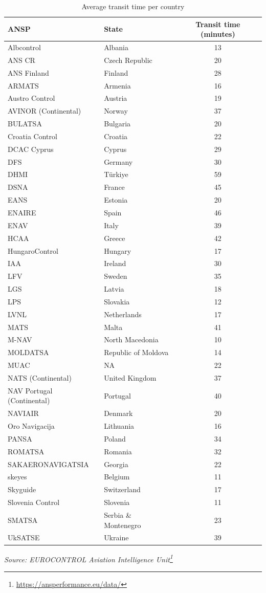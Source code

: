 \documentclass[
  11pt,
  a4paper,
]{book}
\DeclareRobustCommand{\href}[2]{#2\footnote{\url{#1}}}
\begin{document}
\hypertarget{tbl-transit-time}{}
\setlength{\LTpost}{0mm}
\begin{longtable}{llc}
\caption{\label{tbl-transit-time}Average transit time per country }\tabularnewline

\toprule
ANSP & State & Transit time (minutes) \\ 
\midrule
Albcontrol & Albania & 13 \\ 
ANS CR & Czech Republic & 20 \\ 
ANS Finland & Finland & 28 \\ 
ARMATS & Armenia & 16 \\ 
Austro Control & Austria & 19 \\ 
AVINOR (Continental) & Norway & 37 \\ 
BULATSA & Bulgaria & 20 \\ 
Croatia Control & Croatia & 22 \\ 
DCAC Cyprus & Cyprus & 29 \\ 
DFS & Germany & 30 \\ 
DHMI & Türkiye & 59 \\ 
DSNA & France & 45 \\ 
EANS & Estonia & 20 \\ 
ENAIRE & Spain & 46 \\ 
ENAV & Italy & 39 \\ 
HCAA & Greece & 42 \\ 
HungaroControl & Hungary & 17 \\ 
IAA & Ireland & 30 \\ 
LFV & Sweden & 35 \\ 
LGS & Latvia & 18 \\ 
LPS & Slovakia & 12 \\ 
LVNL & Netherlands & 17 \\ 
MATS & Malta & 41 \\ 
M-NAV & North Macedonia & 10 \\ 
MOLDATSA & Republic of Moldova & 14 \\ 
MUAC & NA & 22 \\ 
NATS (Continental) & United Kingdom & 37 \\ 
NAV Portugal (Continental) & Portugal & 40 \\ 
NAVIAIR & Denmark & 20 \\ 
Oro Navigacija & Lithuania & 16 \\ 
PANSA & Poland & 34 \\ 
ROMATSA & Romania & 32 \\ 
SAKAERONAVIGATSIA & Georgia & 22 \\ 
skeyes & Belgium & 11 \\ 
Skyguide & Switzerland & 17 \\ 
Slovenia Control & Slovenia & 11 \\ 
SMATSA & Serbia \& Montenegro & 23 \\ 
UkSATSE & Ukraine & 39 \\ 
\bottomrule
\end{longtable}
\begin{minipage}{\linewidth}
\emph{Source: \href{https://ansperformance.eu/data/}{EUROCONTROL Aviation Intelligence Unit}}\\
\end{minipage}
\end{document}
